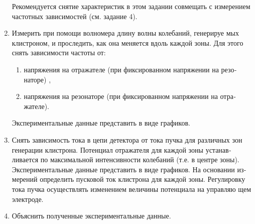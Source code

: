 \begin{enumerate}
	Рекомендуется снятие характеристик в этом задании совмещать с изме­рением частотных зависимостей (см. задание 4).

	\item Измерить при помощи волномера длину волны колебаний, генерируе­
	мых клистроном, и проследить, как она меняется вдоль каждой зоны. Для
	этого снять зависимости частоты от:
		\begin{enumerate}
			\item  напряжения на отражателе (при фиксированном напряжении на резо­
			наторе) ,
			\item  напряжения на резонаторе (при фиксированном напряжении на отра­
			жателе).
		\end{enumerate}
	
	Экспериментальные данные представить в виде графиков.

	\item  Снять зависимость тока в цепи детектора от тока пучка для различных
	зон генерации клистрона. Потенциал отражателя для каждой зоны устанав­
	ливается по максимальной интенсивности колебаний (т.е. в центре зоны).
	Экспериментальные данные представить в виде графиков. На основании из­
	мерений определить пусковой ток клистрона для каждой зоны. Регулировку
	тока пучка осуществлять изменением величины потенциала на управляю­
	щем электроде.

	\item  Объяснить полученные экспериментальные данные.

\end{enumerate}


